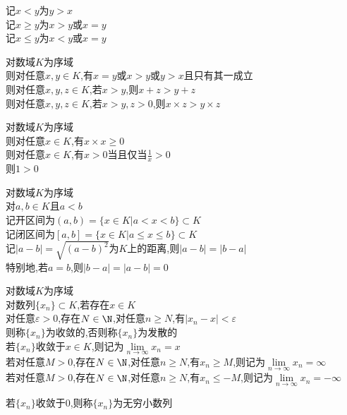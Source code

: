 \begin{zhu}
记$x<y$为$y>x$\\
记$x\geq y$为$x>y$或$x=y$\\
记$x\leq y$为$x<y$或$x=y$
\end{zhu}

\begin{dingli}
对数域$K$为序域\\
则对任意$x,y\in K$,有$x=y$或$x>y$或$y>x$且只有其一成立\\
则对任意$x,y,z\in K$,若$x>y$,则$x+z>y+z$\\
则对任意$x,y,z\in K$,若$x>y,z>0$,则$x\times z>y\times z$
\end{dingli}

\begin{dingli}
对数域$K$为序域\\
则对任意$x\in K$,有$x\times x\geq 0$\\
则对任意$x\in K$,有$x>0$当且仅当$\frac{1}{x}>0$\\
则$1>0$
\end{dingli}

\begin{dingyi}
对数域$K$为序域\\
对$a,b\in K$且$a<b$\\
记开区间为$(a,b)=\{x\in K|a<x<b\}\subset K$\\
记闭区间为$[a,b]=\{x\in K|a\leq x\leq b\}\subset K$\\
记$|a-b|=\sqrt{(a-b)^2}$为$K$上的距离,则$|a-b|=|b-a|$\\
特别地,若$a=b$,则$|b-a|=|a-b|=0$
\end{dingyi}

\begin{dingyi}
对数域$K$为序域\\
对数列$\{x_n\}\subset K$,若存在$x\in K$\\
对任意$\varepsilon>0$,存在$N\in \N$,对任意$n\geq N$,有$|x_n-x|<\varepsilon$\\
则称$\{x_n\}$为收敛的,否则称$\{x_n\}$为发散的\\
若$\{x_n\}$收敛于$x\in K$,则记为$\lim\limits_{n\to\infty}x_n=x$\\
若对任意$M>0$,存在$N\in \N$,对任意$n\geq N$,有$x_n\geq M$,则记为$\lim\limits_{n\to\infty}x_n=\infty$\\
若对任意$M>0$,存在$N\in \N$,对任意$n\geq N$,有$x_n\leq-M$,则记为$\lim\limits_{n\to\infty}x_n=-\infty$
\end{dingyi}

\begin{zhu}
若$\{x_n\}$收敛于$0$,则称$\{x_n\}$为无穷小数列
\end{zhu}

